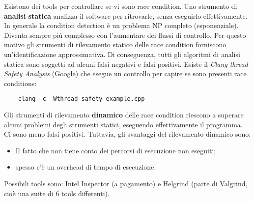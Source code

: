 Esistono dei tools per controllare se vi sono race condition.
Uno strumento di \textbf{analisi statica} analizza il software per ritrovarle, senza eseguirlo effettivamente.
In generale la condition detection è un problema NP completo (esponenziale).
Diventa sempre più complesso con l'aumentare dei flussi di controllo.
Per questo motivo gli strumenti di rilevamento statico delle race condition forniscono un'identificazione approssimativa.
Di conseguenza, tutti gli algoritmi di analisi statica sono soggetti ad alcuni falsi negativi e falsi positivi.
Esiste il \textit{Clang thread Safety Analysis} (Google) che esegue un controllo per capire se sono presenti race conditions:

\begin{lstlisting}
    clang -c -Wthread-safety example.cpp
\end{lstlisting}

Gli strumenti di rilevamento \textbf{dinamico} delle race condition riescono a superare alcuni
problemi degli strumenti statici, eseguendo effettivamente il programma.
Ci sono meno falsi positivi. Tuttavia, gli svantaggi del rilevamento dinamico sono:

\begin{itemize}
    \item Il fatto che non tiene conto dei percorsi di esecuzione non eseguiti;
    \item spesso c'è un overhead di tempo di esecuzione.
\end{itemize}

Possibili tools sono: Intel Inspector (a pagamento) e Helgrind (parte di Valgrind, cioè una suite di 6 tools differenti).

